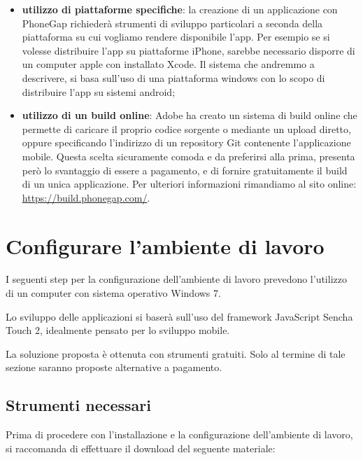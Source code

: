\documentclass[10pt,a4paper,onecolumn]{article}
\begin{document}
\begin{itemize}
	\item \textbf{utilizzo di piattaforme specifiche}: la creazione di un applicazione con PhoneGap richiederà strumenti di sviluppo particolari a seconda della piattaforma su cui vogliamo rendere disponibile l'app. Per esempio se si volesse distribuire l'app su piattaforme iPhone, sarebbe necessario disporre di un computer apple con installato Xcode. Il sistema che andremmo a descrivere, si basa sull'uso di una piattaforma windows con lo scopo di distribuire l'app su sistemi android;
	
	\item \textbf{utilizzo di un build online}: Adobe ha creato un sistema di build online che permette di caricare il proprio codice sorgente o mediante un upload diretto, oppure specificando l'indirizzo di un repository Git contenente l'applicazione mobile. Questa scelta sicuramente comoda e da preferirsi alla prima, presenta però lo svantaggio di essere a pagamento, e di fornire gratuitamente il build di un unica applicazione. Per ulteriori informazioni rimandiamo al sito online: \url{https://build.phonegap.com/}.
\end{itemize}

\clearpage

\section{Configurare l'ambiente di lavoro}

I seguenti step per la configurazione dell'ambiente di lavoro prevedono l'utilizzo di un computer con sistema operativo Windows 7.

Lo sviluppo delle applicazioni si baserà sull'uso del framework JavaScript Sencha Touch 2, idealmente pensato per lo sviluppo mobile.

La soluzione proposta è ottenuta con strumenti gratuiti. Solo al termine di tale sezione saranno proposte alternative a pagamento.

\subsection{Strumenti necessari}

Prima di procedere con l'installazione e la configurazione dell'ambiente di lavoro, si raccomanda di effettuare il download del seguente materiale:
\end{document}
